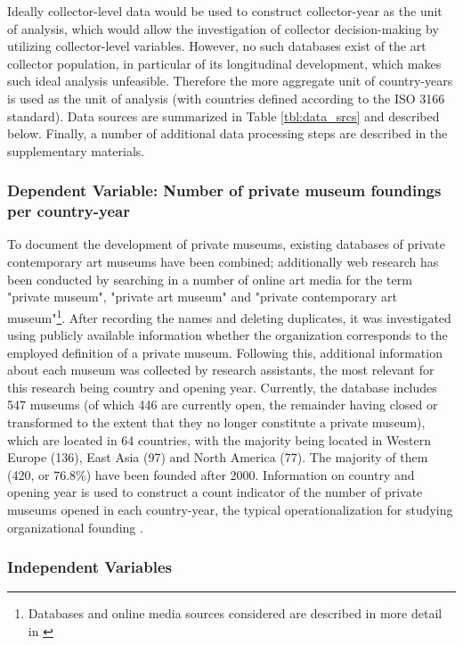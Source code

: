 \documentclass[11pt, authoryear]{elsarticle}
\begin{document}
Ideally collector-level data would be used to construct collector-year as the unit of analysis, which would allow the investigation of collector decision-making by utilizing collector-level variables. 
However, no such databases exist of the art collector population, in particular of its longitudinal development, which makes such ideal analysis unfeasible. 
Therefore the more aggregate unit of country-years is used as the unit of analysis (with countries defined according to the ISO 3166 standard). 
Data sources are summarized in Table \ref{tbl:data_srcs} and described below.
Finally, a number of additional data processing steps are described in the supplementary materials.


\subsubsection*{Dependent Variable: Number of private museum foundings per country-year}


To document the development of private museums, existing databases of private contemporary art museums have been combined; additionally web research has been conducted by searching in a number of online art media for the term "private museum", "private art museum" and "private contemporary art museum"\footnote{Databases and online media sources considered are described in more detail in \citet{Velthuis_etal_2023_boom}}.
After recording the names and deleting duplicates, it was investigated using publicly available information whether the organization corresponds to the employed definition of a private museum.
Following this, additional information about each museum was collected by research assistants, the most relevant for this research being country and opening year.
Currently, the database includes 547 museums (of which 446 are currently open, the remainder having closed or transformed to the extent that they no longer constitute a private museum), which are located in 64 countries, with the majority being located in Western Europe (136), East Asia (97) and North America (77).
The majority of them (420, or 76.8\%) have been founded after 2000.
Information on country and opening year is used to construct a count indicator of the number of private museums opened in each country-year, the typical operationalization for studying organizational founding \citep{Bogaert_etal_2014_ecological}.




\subsubsection*{Independent Variables}
\end{document}
